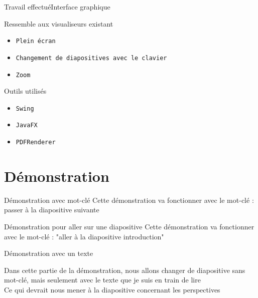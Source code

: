 \documentclass[10pt]{beamer}
\begin{document}
\begin{frame}{Travail effectué}{Interface graphique}
	\begin{block}{Ressemble aux visualiseurs existant}
	  	\begin{itemize}
	    		\item {\tt Plein écran}
	    		\item {\tt Changement de diapositives avec le clavier}
	    		\item {\tt Zoom}
		\end{itemize}
	\end{block}

	\begin{block}{Outils utilisés}
	  	\begin{itemize}
	    			\item {\tt Swing}
	    			\item {\tt JavaFX}	    		
			    \item {\tt PDFRenderer}		
		\end{itemize}
	\end{block}		  			
\end{frame}

\section{Démonstration}
\begin{frame}{Démonstration avec mot-clé}
	Cette démonstration va fonctionner avec le mot-clé : passer à la diapositive suivante	
\end{frame}

\begin{frame}{Démonstration pour aller sur une diapositive}
	Cette démonstration va fonctionner avec le mot-clé : "aller à la diapositive introduction"		
\end{frame}

\begin{frame}{Démonstration avec un texte}

Dans cette partie de la démonstration, nous allons changer de diapositive sans mot-clé, mais seulement avec le texte que je suis en train de lire\\
Ce qui devrait nous mener à la diapositive concernant les perspectives
\end{frame}
\end{document}
